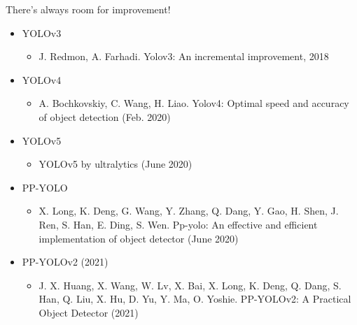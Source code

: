 \documentclass[10pt]{beamer}
\theoremstyle{remark}
\theoremstyle{definition}
\begin{document}
\begin{frame}{There's always room for improvement!}
\begin{itemize}
    \item YOLOv3
    \begin{itemize}
        \item J. Redmon, A. Farhadi. Yolov3: An incremental improvement, 2018
    \end{itemize}
    \item YOLOv4
    \begin{itemize}
        \item A. Bochkovskiy, C. Wang, H. Liao. Yolov4: Optimal speed and accuracy of object detection (Feb. 2020)
    \end{itemize}
    \item YOLOv5
    \begin{itemize}
        \item YOLOv5 by ultralytics (June 2020)
    \end{itemize}
    \item PP-YOLO
    \begin{itemize}
        \item X. Long, K. Deng, G. Wang, Y. Zhang, Q. Dang, Y. Gao, H. Shen, J. Ren, S. Han, E. Ding, S. Wen. Pp-yolo: An effective and efficient implementation of object detector (June 2020)
    \end{itemize}
    \item PP-YOLOv2 (2021)
    \begin{itemize}
        \item J. X. Huang, X. Wang, W. Lv, X. Bai, X. Long, K. Deng, Q. Dang, S. Han, Q. Liu, X. Hu, D. Yu, Y. Ma, O. Yoshie. PP-YOLOv2: A Practical Object Detector (2021)
    \end{itemize}

\end{itemize}
    
\end{frame}
\end{document}
